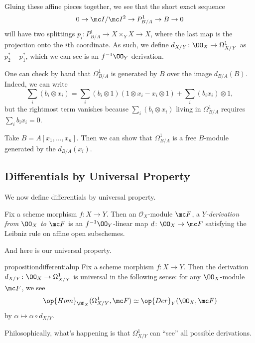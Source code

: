 \documentclass[../notes.tex]{subfiles}
\begin{document}
Gluing these affine pieces together, we see that the short exact sequence
\[0\to\mc I/\mc I^2\to P^1_{B/A}\to B\to0\]
will have two splittings $p_i\colon P^1_{B/A}\to X\times_YX\to X$, where the last map is the projection onto the $i$th coordinate. As such, we define $d_{X/Y}\colon\OO_X\to\Omega^1_{X/Y}$ as $p_2^*-p_1^*$, which we can see is an $f^{-1}\OO_Y$-derivation.
\begin{remark}
	One can check by hand that $\Omega^1_{B/A}$ is generated by $B$ over the image $d_{B/A}(B)$. Indeed, we can write
	\[\sum_i(b_i\otimes x_i)=\sum_i(b_i\otimes1)(1\otimes x_i-x_i\otimes1)+\sum_i(b_ix_i)\otimes1,\]
	but the rightmost term vanishes because $\sum_i(b_i\otimes x_i)$ living in $\Omega^1_{B/A}$ requires $\sum_ib_ix_i=0$.
\end{remark}
\begin{example}
	Take $B=A[x_1,\ldots,x_n]$. Then we can show that $\Omega^1_{B/A}$ is a free $B$-module generated by the $d_{B/A}(x_i)$.
\end{example}

\subsection{Differentials by Universal Property}
We now define differentials by universal property.
\begin{definition}[Derivation]
	Fix a scheme morphism $f\colon X\to Y$. Then an $\mathcal O_X$-module $\mc F$, a \textit{$Y$-derivation from $\OO_X$ to $\mc F$} is an $f^{-1}\OO_Y$-linear map $d\colon\OO_X\to\mc F$ satisfying the Leibniz rule on affine open subschemes.
\end{definition}
And here is our universal property.
\begin{restatable}{proposition}{differentialup} \label{prop:diff-up}
	Fix a scheme morphism $f\colon X\to Y$. Then the derivation $d_{X/Y}\colon\OO_X\to\Omega^1_{X/Y}$ is universal in the following sense: for any $\OO_X$-module $\mc F$, we see
	\[\op{Hom}_{\OO_X}(\Omega^1_{X/Y},\mc F)\simeq\op{Der}_Y(\OO_X,\mc F)\]
	by $\alpha\mapsto\alpha\circ d_{X/Y}$.
\end{restatable}
Philosophically, what's happening is that $\Omega^1_{X/Y}$ can ``see'' all possible derivations.
\end{document}
